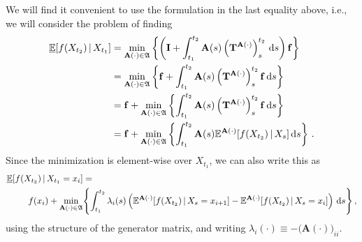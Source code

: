 \documentclass[10pt]{article}
\newcommand{\dx}[1][x]{\text{\,d}#1}
\begin{document}
We will find it convenient to use the formulation in the last equality above, i.e., we will consider the problem of finding
\begin{align*}
\underline{\mathbb{E}}[f(X_{t_2})\,\vert\,X_{t_1}] &= \min_{\mathbf{A}(\cdot)\in\mathfrak{A}}\left\{\left(\mathbf{I} + \int_{t_1}^{t_2}\mathbf{A}(s)\left(\mathbf{T}^{\mathbf{A}(\cdot)}\right)_{s}^{t_2}\dx[s]\right)\mathbf{f}\right\} \\
&= \min_{\mathbf{A}(\cdot)\in\mathfrak{A}}\left\{\mathbf{f} + \int_{t_1}^{t_2}\mathbf{A}(s)\left(\mathbf{T}^{\mathbf{A}(\cdot)}\right)_{s}^{t_2}\mathbf{f}\dx[s]\right\} \\
 &= \mathbf{f} + \min_{\mathbf{A}(\cdot)\in\mathfrak{A}}\left\{\int_{t_1}^{t_2}\mathbf{A}(s)\left(\mathbf{T}^{\mathbf{A}(\cdot)}\right)_{s}^{t_2}\mathbf{f}\dx[s]\right\} \\
 &= \mathbf{f} + \min_{\mathbf{A}(\cdot)\in\mathfrak{A}}\left\{\int_{t_1}^{t_2}\mathbf{A}(s)\mathbb{E}^{\mathbf{A}(\cdot)}[f(X_{t_2})\,\vert\,X_s]\dx[s]\right\} \,.
\end{align*}
Since the minimization is element-wise over $X_{t_1}$, we can also write this as
\begin{align*}
\underline{\mathbb{E}}[f(X_{t_2})\,\vert\,X_{t_1}=x_i] &= \\
f(x_i) + \min_{\mathbf{A}(\cdot)\in\mathfrak{A}}&\Biggl\{\int_{t_1}^{t_2}\lambda_i(s)\left(\mathbb{E}^{\mathbf{A}(\cdot)}[f(X_{t_2})\,\vert\,X_s=x_{i+1}] - \mathbb{E}^{\mathbf{A}(\cdot)}[f(X_{t_2})\,\vert\,X_s=x_i]\right)\dx[s]\Biggr\}\,,
\end{align*}
using the structure of the generator matrix, and writing $\lambda_i(\cdot)\equiv-\bigl(\mathbf{A}(\cdot)\bigr)_{ii}$.
\end{document}
